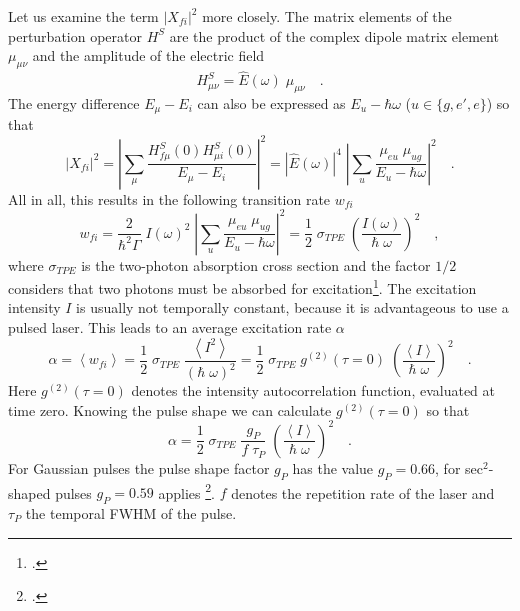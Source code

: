 Let us examine the term $|X_{fi}|^2$  more closely. The
matrix elements of the perturbation operator $H^S$ are the product of the
complex dipole matrix element $\mu_{\mu \nu}$ and the amplitude of the electric field
\begin{equation}
  H^S_{\mu \nu} = \hat{E}(\omega) \; \mu_{\mu \nu} \quad .
\end{equation}
The energy difference $E_\mu - E_i$ can also be expressed as $E_u - \hbar
\omega$ ($u \in \{g, e', e \}$) so that
\begin{equation}
|X_{fi}|^2 = \left| \sum_{\mu} \frac{H^S_{f \mu} (0) H^S_{\mu i}
(0)}{E_{\mu} - E_i} \right|^2 = \left| \hat{E}(\omega) \right|^4
\;  \left| \sum_{u} \frac{\mu_{e u} \; \mu_{u g}}{E_{u} - \hbar
\omega} \right|^2 \quad .
\end{equation}
All in all, this results in the following transition rate $w_{fi}$ 
\begin{equation}
w_{fi} =  \frac{2}{\hbar^2 \Gamma} \; I(\omega)^2  \; \left|
\sum_{u} \frac{\mu_{e u} \; \mu_{u g}}{E_{u} - \hbar \omega}
\right|^2 = \frac{1}{2} \; \sigma_{TPE} \;
\left(\frac{I(\omega)}{\hbar \; \omega}\right)^2 \quad ,
\label{gl_theo_nlo_tpe_uebergansgrate}
\end{equation}
where $\sigma_{TPE}$ is the two-photon absorption cross section
and the factor $1/2$ considers that two photons
must be absorbed for excitation\footcite{xu97}. The
excitation intensity $I$ is  usually not temporally
constant, because it is advantageous to use a pulsed laser. This leads to an average excitation rate $\alpha$
\begin{equation}
  \alpha = \left< w_{fi} \right> =
  \frac{1}{2} \; \sigma_{TPE} \; \frac{ \left<I^2 \right>}{(\hbar \; \omega)^2}
  = \frac{1}{2} \; \sigma_{TPE} \; g^{(2)}(\tau = 0) \;
  \left(\frac{\left< I \right>}{\hbar \; \omega}\right)^2 \quad .
\end{equation}
Here $g^{(2)}(\tau = 0)$ denotes the 
intensity autocorrelation function, evaluated at  time zero. 
Knowing the pulse shape we can calculate 
 $g^{(2)}(\tau
= 0)$ so that
\begin{equation}
  \alpha
  = \frac{1}{2} \; \sigma_{TPE} \; \frac{g_P}{f \; \tau_P} \;
  \left(\frac{\left< I \right>}{\hbar \; \omega}\right)^2 \quad .
\end{equation}
For Gaussian pulses the pulse shape factor $g_P$ has the value
$g_P = 0.66$, for sec$^2$-shaped pulses $g_P = 0.59$ applies
\footcite{xu97}. $f$ denotes the repetition rate of the laser and
$\tau_P$ the temporal FWHM of the pulse. 

